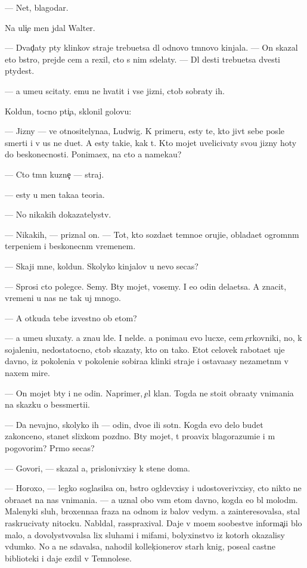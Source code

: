 \documentclass[10pt]{book}
\begin{document}
— Net, blagodar{\iu}.

Na uli{\c}e men{\ia} jdal Walter.

— Dvad{\c}aty p{\ia}ty klinkov straje{\y} trebu{\y}etsa dl{\ia} odnovo t{\e}mnovo kinjala. — On skazal eto b{\yi}stro, prejde cem {\y}a rexil, cto s nim sdelaty. — Dl{\ia} des{\ia}ti trebu{\y}etsa dvesti p{\ia}tydes{\ia}t.

— {\Y}a ume{\y}u scitaty. {\Y}emu ne hvatit i vse{\y} jizni, ctob{\yi} sobraty ih.

Koldun, tocno pti{\c}a, sklonil golovu:

— Jizny — ve{\x} otnositelyna{\y}a, Ludwig. K primeru, {\y}esty te, kto jiv{\e}t sebe posle smerti i v us ne du{\y}et. A {\y}esty taki{\y}e, kak t{\yi}. Kto mojet uvelicivaty svo{\y}u jizny hoty do beskonecnosti. Ponima{\y}ex, na cto {\y}a nameka{\y}u?

— Cto t{\e}mn{\yi}{\y} kuzne{\c} — straj.

— {\Y}esty u men{\ia} taka{\y}a teori{\y}a.

— No nikakih dokazatelystv.

— Nikakih, — priznal on. — Tot, kto sozda{\y}et temno{\y}e oruji{\y}e, oblada{\y}et ogromn{\yi}m terpeni{\y}em i beskonecn{\yi}m vremenem.

— Skaji mne, koldun. Skolyko kinjalov u nevo se{\y}cas?

— Sprosi cto polegce. Semy. B{\yi}ty mojet, vosemy. I {\y}e{\x}o odin dela{\y}etsa. A znacit, vremeni u nas ne tak uj mnogo.

— A otkuda tebe izvestno ob etom?

— {\Y}a ume{\y}u sluxaty. {\Y}a zna{\y}u l{\iu}de{\y}. I nel{\iu}de{\y}. {\Y}a ponima{\y}u {\y}evo lucxe, cem {\c}erkovniki, no, k sojaleni{\y}u, nedostatocno, ctob{\yi} skazaty, kto on tako{\y}. Etot celovek rabota{\y}et uje davno, iz pokoleni{\y}a v pokoleni{\y}e sobira{\y}a klinki straje{\y} i ostava{\y}asy nezametn{\yi}m v naxem mire.

— On mojet b{\yi}ty i ne odin. Naprimer, {\c}el{\yi}{\y} klan. Togda ne sto{\y}it obra{\x}aty vnimani{\y}a na skazku o bessmerti{\y}i.

— Da nevajno, skolyko ih — odin, dvo{\y}e ili sotn{\ia}. Kogda {\y}evo delo budet zakonceno, stanet slixkom pozdno. B{\yi}ty mojet, t{\yi} pro{\y}avix blagorazumi{\y}e i m{\yi} pogovorim? Pr{\ia}mo se{\y}cas?

— Govori, — skazal {\y}a, prislonivxisy k stene doma.

— Horoxo, — legko soglasilsa on, b{\yi}stro ogl{\ia}devxisy i udostoverivxisy, cto nikto ne obra{\x}a{\y}et na nas vnimani{\y}a. — {\Y}a uznal obo vs{\e}m etom davno, kogda {\y}e{\x}o b{\yi}l molod{\yi}m. Malenyki{\y} sluh, broxenna{\y}a fraza na odnom iz balov vedym. {\Y}a zainteresovalsa, stal raskrucivaty nitocku. Nabl{\iu}dal, rasspraxival. Daje v mo{\y}em soob{\x}estve informa{\c}i{\y}i b{\yi}lo malo, {\y}a dovolystvovalsa lix sluhami i mifami, bolyxinstvo iz kotor{\yi}h okazalisy v{\yi}dumko{\y}. No {\y}a ne sdavalsa, nahodil kollek{\c}ionerov star{\yi}h knig, pose{\x}al castn{\yi}{\y}e biblioteki i daje {\y}ezdil v Temnoles{\y}e.
\end{document}
